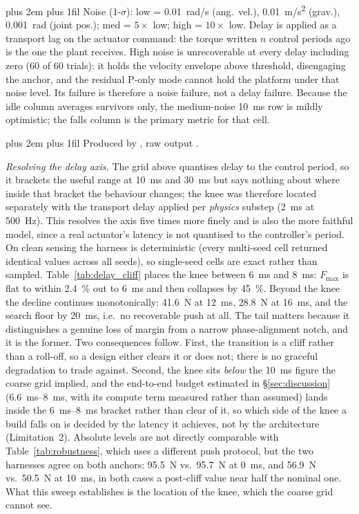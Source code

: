 \documentclass[conference]{IEEEtran}
\newcommand{\tabnote}{\par\leftskip=0pt\rightskip=0pt plus 2em%
  \parfillskip=0pt plus 1fil\relax}
\begin{document}
\begin{table}[t]
\vspace{2pt}\tabnote\noindent
Noise (1-$\sigma$): low = \SI{0.01}{rad/s} (ang.\ vel.), \SI{0.01}{m/s^2} (grav.), \SI{0.001}{rad} (joint pos.); med = $5\times$ low; high = $10\times$ low.
Delay is applied as a transport lag on the actuator command: the torque written
$n$ control periods ago is the one the plant receives.
High noise is unrecoverable at every delay including zero (\num{60} of \num{60} trials): it holds the velocity envelope above threshold, disengaging the anchor, and the residual P-only mode cannot hold the platform under that noise level. Its failure is therefore a noise failure, not a delay failure.
Because the idle column averages survivors only, the medium-noise \SI{10}{ms} row is mildly optimistic; the falls column is the primary metric for that cell.
\tabnote\noindent
Produced by ,
raw output .
\end{table}

\emph{Resolving the delay axis.}
The grid above quantises delay to the control period, so it brackets the useful range at \SI{10}{ms} and \SI{30}{ms} but says nothing about where inside that bracket the behaviour changes; the knee was therefore located separately with the transport delay applied per \emph{physics} substep (\SI{2}{ms} at \SI{500}{Hz}). This resolves the axis five times more finely and is also the more faithful model, since a real actuator's latency is not quantised to the controller's period. On clean sensing the harness is deterministic (every multi-seed cell returned identical values across all seeds), so single-seed cells are exact rather than sampled.
Table~\ref{tab:delay_cliff} places the knee between \SI{6}{ms} and \SI{8}{ms}: $F_{\max}$ is flat to within \SI{2.4}{\percent} out to \SI{6}{ms} and then collapses by \SI{45}{\percent}. Beyond the knee the decline continues monotonically: \SI{41.6}{N} at \SI{12}{ms}, \SI{28.8}{N} at \SI{16}{ms}, and the search floor by \SI{20}{ms}, i.e.\ no recoverable push at all. The tail matters because it distinguishes a genuine loss of margin from a narrow phase-alignment notch, and it is the former. Two consequences follow. First, the transition is a cliff rather than a roll-off, so a design either clears it or does not; there is no graceful degradation to trade against. Second, the knee sits \emph{below} the \SI{10}{ms} figure the coarse grid implied, and the end-to-end budget estimated in \S\ref{sec:discussion} (\SIrange{6.6}{8}{ms}, with its compute term measured rather than assumed) lands inside the \SIrange{6}{8}{ms} bracket rather than clear of it, so which side of the knee a build falls on is decided by the latency it achieves, not by the architecture (Limitation~2).
Absolute levels are not directly comparable with Table~\ref{tab:robustness}, which uses a different push protocol, but the two harnesses agree on both anchors: \SI{95.5}{N} vs.\ \SI{95.7}{N} at \SI{0}{ms}, and \SI{56.9}{N} vs.\ \SI{50.5}{N} at \SI{10}{ms}, in both cases a post-cliff value near half the nominal one. What this sweep establishes is the location of the knee, which the coarse grid cannot see.
\end{document}
